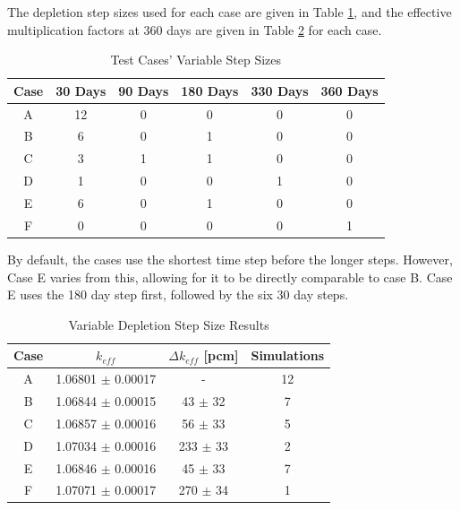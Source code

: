 The depletion step sizes used for each case are given in Table \ref{tab:step-sizes}, and the effective multiplication factors at 360 days are given in Table \ref{tab:var-dep-step-size} for each case.

\begin{table}[H]
    \centering
    \caption{Test Cases' Variable Step Sizes}
    \begin{tabular}{c|c|c|c|c|c}
    \hline
    Case & 30 Days & 90 Days & 180 Days & 330 Days & 360 Days \\
    \hline
    A & 12 & 0 & 0 & 0 & 0 \\
    \hline
    B & 6 & 0 & 1 & 0 & 0 \\
    \hline
    C & 3 & 1 & 1 & 0 & 0 \\
    \hline
    D & 1 & 0 & 0 & 1 & 0 \\
    \hline
    E & 6 & 0 & 1 & 0 & 0 \\
    \hline
    F & 0 & 0 & 0 & 0 & 1 \\
    \hline
    \end{tabular}
    \label{tab:step-sizes}
\end{table}

By default, the cases use the shortest time step before the longer steps. However, Case E varies from this, allowing for it to be directly comparable to case B. Case E uses the 180 day step first, followed by the six 30 day steps.



\begin{table}[H]
\renewcommand{\arraystretch}{1.25}
\caption{Variable Depletion Step Size Results}
\label{tab:var-dep-step-size}
\begin{center}
\begin{tabular}{ c | c | c | c }
 \hline
 Case & $k_{eff}$ & $\Delta k_{eff}$ [pcm]  & Simulations\\
 \hline
 \hline
 A & 1.06801 $\pm$ 0.00017  & - & 12\\
 B & 1.06844 $\pm$ 0.00015 & 43 $\pm$ 32  & 7\\
 C & 1.06857 $\pm$ 0.00016  & 56 $\pm$ 33  & 5\\
 D & 1.07034 $\pm$ 0.00016 & 233 $\pm$ 33  & 2\\
 E & 1.06846 $\pm$ 0.00016 & 45 $\pm$ 33  & 7\\
 F & 1.07071 $\pm$ 0.00017 & 270 $\pm$ 34 & 1\\
 \hline
\end{tabular}
\end{center}
\end{table}

